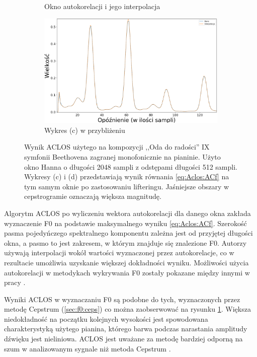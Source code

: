 \documentclass[12pt,a4paper,twoside]{mwart}
\begin{document}
\begin{figure}[ht]
\begin{subfigure}{0.5\textwidth}
    \caption{Okno autokorelacji i jego interpolacja}
  \end{subfigure}
  \begin{subfigure}{0.49\textwidth}
    \centering
    \includegraphics[width=1.\linewidth]{images/ACLOS/Interpolacja_superzoomed_cropped.png}
    \caption{Wykres (c) w przybliżeniu}
  \end{subfigure}
  \caption{Wynik ACLOS użytego na kompozycji ,,Oda do radości'' IX symfonii Beethovena zagranej monofonicznie na pianinie. Użyto okno Hanna o długości 2048 sampli z odstępami długości 512 sampli. Wykresy (c) i (d) przedstawiają wynik równania \ref{eq:Aclos:ACf} na tym samym oknie po zastosowaniu lifteringu. Jaśniejsze obszary w cepstrogramie oznaczają większa magnitudę.}
  \label{fig:aclos:results}
\end{figure}

Algorytm ACLOS po wyliczeniu wektora autokorelacji dla danego okna zakłada wyznaczenie F0 na podstawie maksymalnego wyniku \ref{eq:Aclos:ACf}. Szerokość pasma pojedyńczego spektralnego komponentu zależna jest od przyjętej długości okna, a pasmo to jest zakresem, w którym znajduje się znalezione F0. Autorzy używają interpolacji wokół wartości wyznaczonej przez autokorelacje, co w rezultacie umożliwia uzyskanie większej dokładności wyniku. Możliwości użycia autokorelacji w metodykach wykrywania F0 zostały pokazane między innymi w pracy \cite[1046-1047]{Transcription:Suzuki:EstimationOfMistunedFrequency}.

Wyniki ACLOS w wyznaczaniu F0 są podobne do tych, wyznaczonych przez metodę Cepstrum (\ref{sec:f0:ceps}) co można zaobserwować na rysunku \ref{fig:aclos:results}. Większa niedokładność na początku kolejnych wysokości jest spowodowana charakterystyką użytego pianina, którego barwa podczas narastania amplitudy dźwięku jest nieliniowa. ACLOS jest uważane za metodę bardziej odporną na szum w analizowanym sygnale niż metoda Cepstrum \cite{Transcription:Kunieda:Aclos}.
\end{document}

